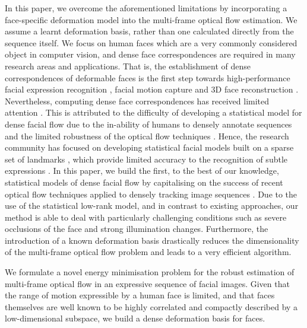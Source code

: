 In this paper, we overcome the aforementioned limitations by incorporating a face-specific 
deformation model into the multi-frame optical flow estimation. We assume a learnt 
deformation basis, rather than one calculated directly from the sequence itself. We 
focus on human faces which are a very commonly considered object in computer vision, 
and dense face correspondences are required in many research areas and applications. 
That is, the establishment of dense correspondences of deformable faces is the first step 
towards high-performance facial expression recognition \cite{koelstra2010dynamic}, facial 
motion capture \cite{Beeler:2011ey} and 3D face reconstruction \cite{garg2013dense}. 
Nevertheless, computing dense face correspondences has received limited attention 
\cite{decarlo2000optical,yacoob1996recognizing}. This is attributed to the difficulty of 
developing a statistical model for dense facial flow due to the in-ability of humans to 
densely annotate sequences and the limited robustness of the optical flow techniques 
\cite{decarlo2000optical}. Hence, the research community has focused on developing 
statistical facial models built on a sparse set of landmarks \cite{xiong2013supervised}, 
which provide limited accuracy to the recognition of subtle expressions \cite{li2013spontaneous}. 
In this paper, we build the first, to the best of our knowledge, statistical models of 
dense facial flow by capitalising on the success of recent optical flow techniques applied to 
densely tracking image sequences \cite{Garg:2013hu}. Due to the use of the statistical 
low-rank model, and in contrast to existing approaches, our method is able to deal with 
particularly challenging conditions such as severe occlusions of the face and strong 
illumination changes. Furthermore, the introduction of a known deformation basis drastically 
reduces the dimensionality of the multi-frame optical flow problem and leads to a 
very efficient algorithm.

We formulate a novel energy minimisation problem for the robust estimation of 
multi-frame optical flow in an expressive sequence of facial images.
Given that the range of motion expressible by a human face is limited, and that
faces themselves are well known to be highly correlated and compactly described 
by a low-dimensional subspace, we build a dense deformation 
basis for faces.

